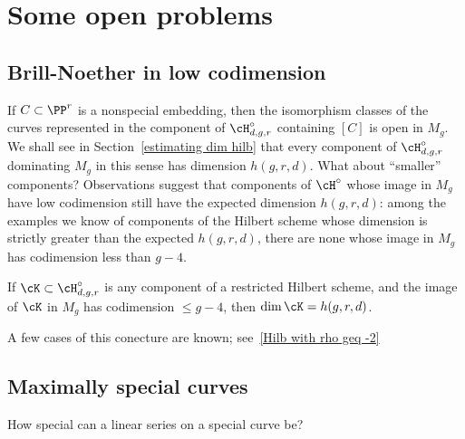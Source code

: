 \section{Some open problems}\label{open problems}

\subsection{Brill-Noether in low codimension}
 
If $C\subset \PP^r$ is a nonspecial embedding, then the isomorphism classes of the curves represented
in the component of $\cH^\circ_{d,g,r}$ containing $[C]$ is open in $M_g$. We shall see in Section~\ref{estimating dim hilb} that every component of $\cH^\circ_{d,g,r}$  dominating $M_g$ in this sense has dimension $h(g,r,d)$. 
What about ``smaller'' components?
Observations suggest that components of $\cH^\circ$ whose image in $M_g$ have low codimension still have the expected dimension $h(g,r,d)$: among the examples we know of components of the Hilbert scheme whose dimension is strictly greater than the expected $h(g,r,d)$, there are none whose image in $M_g$ has codimension less than $g-4$. 

\begin{conjecture}\label{large rho hilb dimension}
If $\cK \subset \cH^\circ_{d,g,r}$ is any component of a restricted Hilbert scheme, and the image of $\cK$ in $M_g$ has codimension $\leq g-4$, then $\dim \cK = h(g,r,d)$.
\end{conjecture}

A few cases of this conecture are known; see~\ref{Hilb with rho geq -2}


\subsection{Maximally special  curves} 
How special can a linear series on a special curve be?

